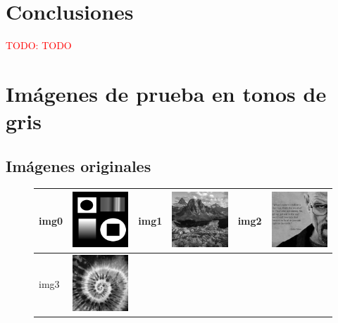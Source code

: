 \documentclass{article}
\newcommand{\TODO}[1]{\textcolor{red}{TODO: #1}}
\begin{document}
\section{Conclusiones}

\TODO{TODO}

\newpage
\appendix
\section{Imágenes de prueba en tonos de gris}

\subsection{Imágenes originales}

\begin{figure}[!htp]
\begin{center}
\begin{tabular}[t]{|ll|ll|ll|}
\hline
img0 & \includegraphics[width=3cm]{../imgs/input/imgs_gray/img00.png} &
img1 & \includegraphics[width=3cm]{../imgs/input/imgs_gray/img01.png} &
img2 & \includegraphics[width=3cm]{../imgs/input/imgs_gray/img02.png} \\
\hline
img3 & \includegraphics[width=3cm]{../imgs/input/imgs_gray/img03.png} &

\end{tabular}
\end{center}
\end{figure}
\end{document}
